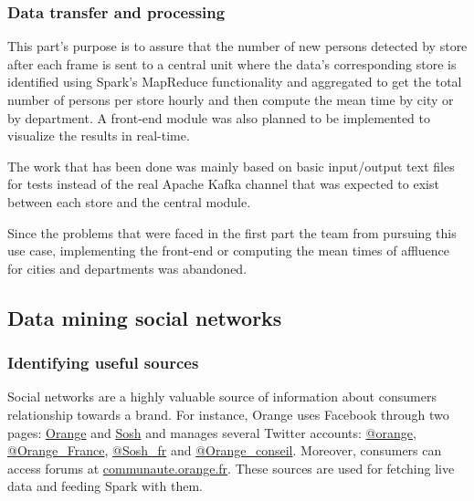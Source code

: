 \documentclass[11pt]{article}
\begin{document}

\subsubsection{Data transfer and processing}

This part’s purpose is to assure that the number of new persons detected by store after each frame is sent to a central unit where the data’s corresponding store is identified using \textsf{Spark}’s MapReduce functionality and aggregated to get the total number of persons per store hourly and then compute the mean time by city or by department. A front-end module was also planned to be implemented to visualize the results in real-time.

The work that has been done was mainly based on basic input/output text files for tests instead of the real \textsf{Apache Kafka} channel that was expected to exist between each store and the central module.

Since the problems that were faced in the first part the team from pursuing this use case, implementing the front-end or computing the mean times of affluence for cities and departments was abandoned.

\subsection{Data mining social networks}

\subsubsection{Identifying useful sources}

Social networks are a highly valuable source of information about consumers relationship towards a brand. For instance, \textsf{Orange} uses \textsf{Facebook} through two pages: \href{https://www.facebook.com/Orange.France/?ref=ts}{\textsf{Orange}} and \href{https://www.facebook.com/sosh/?fref=ts}{\textsf{Sosh}} and manages several \textsf{Twitter} accounts: \href{https://twitter.com/orange}{\textsf{@orange}}, \href{https://twitter.com/Orange_France}{\textsf{@Orange\_France}}, \href{https://twitter.com/Sosh_fr}{\textsf{@Sosh\_fr}} and \href{https://twitter.com/Orange_conseil}{\textsf{@Orange\_conseil}}. Moreover, consumers can access forums at \href{https://communaute.orange.fr}{\url{communaute.orange.fr}}. These sources are used for fetching live data and feeding \textsf{Spark} with them.
\end{document}
